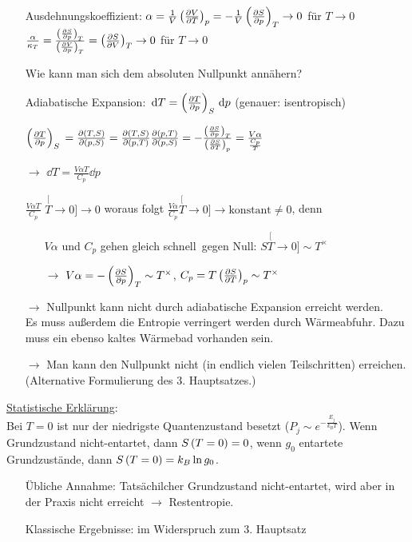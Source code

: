 \begin{itemize}[align=left]
  \item[Ausdehnungskoeffizient:] $\alpha = \frac{1}{V} \left(\frac{\partial V}{\partial T}\right)_{p} = - \frac{1}{V}\left(\frac{\partial S}{\partial p}\right)_{T} \to 0$ für $T\to 0$\\
  $\frac{\alpha}{\kappa_T} = \frac{\left(\frac{\partial S}{\partial p}\right)_{T}}{\left(\frac{\partial V}{\partial p}\right)_{T}} = \left(\frac{\partial S}{\partial V}\right)_{T} \to 0$ für $T\to 0$
  \item[Wie] kann man sich dem absoluten Nullpunkt annähern?
  \item[Adiabatische Expansion:] $\,\text d{T} = \left(\frac{\partial T}{\partial p}\right)_{S} \,\text d{p}$ (genauer: isentropisch)
  \item[$\left(\frac{\partial T}{\partial p}\right)_{S}$] $= \frac{\partial \left( T,S \right)}{\partial \left( p,S \right)} = \frac{\partial \left( T,S \right)}{\partial \left( p,T \right)}\frac{\partial \left( p,T \right)}{\partial \left( p,S \right)} = - \frac{\left(\frac{\partial S}{\partial p}\right)_{T}}{\left(\frac{\partial S}{\partial T}\right)_{p}} = \frac{V\alpha}{\frac{C_p}{T}}$
  \item[$\rightarrow$] $\dd{T} = \frac{V\alpha T}{C_p}\dd{p}$
  \item[$\frac{V\alpha T}{C_p}$] $\stackrel[T\to 0]{}{\rightarrow} 0$ woraus folgt $\frac{V\alpha}{C_p} \stackrel[T\to 0]{}{\rightarrow} \text{konstant} \neq 0$, denn
  \begin{itemize}[align=left]
    \item[$V\alpha$] und $C_p$ gehen \glqq gleich schnell\grqq\ gegen Null: $S\stackrel[T\to 0]{}{\sim} T^{\times}$
    \item[$\rightarrow$] $V\alpha = -\left(\frac{\partial S}{\partial p}\right)_{T} \sim T^{\times}$, $C_p = T \left(\frac{\partial S}{\partial T}\right)_{p} \sim T^{\times}$
  \end{itemize}
  \item[$\rightarrow$] Nullpunkt kann nicht durch adiabatische Expansion erreicht werden.\\
  Es muss außerdem die Entropie verringert werden durch Wärmeabfuhr. Dazu muss ein ebenso kaltes Wärmebad vorhanden sein.
  \item[$\rightarrow$] Man kann den Nullpunkt nicht (in endlich vielen Teilschritten) erreichen. (Alternative Formulierung des 3. Hauptsatzes.)
\end{itemize}

\begin{figure}[H]
  \centering
  
\end{figure}

\uline{Statistische Erklärung}:\\
Bei $T=0$ ist nur der niedrigste Quantenzustand besetzt ($P_j \sim e^{-\frac{E_j}{k_B T}}$). Wenn Grundzustand nicht-entartet, dann $S\left( T=0 \right) = 0$, wenn $g_0$ entartete Grundzustände, dann $S\left( T=0 \right) = k_B \ln g_0$.
\begin{itemize}[align=left]
  \item[Übliche Annahme:] Tatsächilcher Grundzustand nicht-entartet, wird aber in der Praxis nicht erreicht $\rightarrow$ Restentropie.
  \item[Klassische Ergebnisse:] im Widerspruch zum 3. Hauptsatz
\end{itemize}

